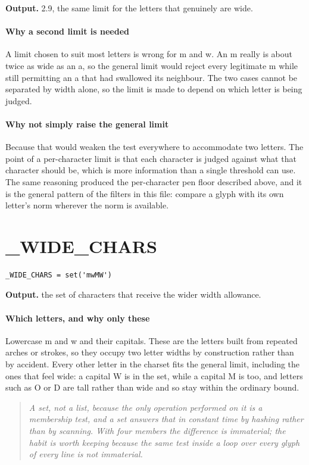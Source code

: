 \noindent\textbf{Output.} 2.9, the same limit for the letters that genuinely are wide.


\paragraph{Why a second limit is needed}
A limit chosen to suit most letters is wrong for m and w. An m really is about twice as wide as an a, so the general limit would reject every legitimate m while still permitting an a that had swallowed its neighbour. The two cases cannot be separated by width alone, so the limit is made to depend on which letter is being judged.


\paragraph{Why not simply raise the general limit}
Because that would weaken the test everywhere to accommodate two letters. The point of a per-character limit is that each character is judged against what that character should be, which is more information than a single threshold can use. The same reasoning produced the per-character pen floor described above, and it is the general pattern of the filters in this file: compare a glyph with its own letter's norm wherever the norm is available.


\section{\_WIDE\_CHARS}
\begin{lstlisting}[style=sig]
_WIDE_CHARS = set('mwMW')
\end{lstlisting}

\noindent\textbf{Output.} the set of characters that receive the wider width allowance.


\paragraph{Which letters, and why only these}
Lowercase m and w and their capitals. These are the letters built from repeated arches or strokes, so they occupy two letter widths by construction rather than by accident. Every other letter in the charset fits the general limit, including the ones that feel wide: a capital W is in the set, while a capital M is too, and letters such as O or D are tall rather than wide and so stay within the ordinary bound.


\begin{quote}\small\itshape A set, not a list, because the only operation performed on it is a membership test, and a set answers that in constant time by hashing rather than by scanning. With four members the difference is immaterial; the habit is worth keeping because the same test inside a loop over every glyph of every line is not immaterial.\end{quote}

